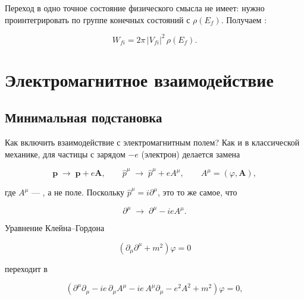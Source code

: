\documentclass[../final.tex]{subfiles}
\begin{document}
Переход в одно точное состояние физического смысла не имеет:
нужно проинтегрировать по группе конечных состояний с
 $\rho(E_f)$.
Получаем :

\begin{equation*}
    W_{fi}
    =
    2\pi\,|V_{fi}|^2\,\rho(E_f).
\end{equation*}


\section{Электромагнитное взаимодействие}

\subsection{Минимальная подстановка}

Как включить взаимодействие с электромагнитным полем?
Как и в классической механике, для частицы с зарядом $-e$
(электрон) делается замена

\begin{equation*}
    \mathbf p\;\longrightarrow\;\mathbf p+e\mathbf A,
    \qquad
    \hat p^\mu\;\longrightarrow\;\hat p^\mu+eA^\mu,
    \qquad
    A^\mu=(\varphi,\mathbf A),
\end{equation*}

где $A^\mu$ --- , а не поле.
Поскольку $\hat p^\mu=i\partial^\mu$, это то же самое, что

\begin{equation*}
    \partial^\mu
    \;\longrightarrow\;
    \partial^\mu-ieA^\mu.
\end{equation*}

Уравнение Клейна--Гордона

\begin{equation*}
    \left(\partial_\mu\partial^\mu+m^2\right)\varphi=0
\end{equation*}

переходит в 

\begin{equation*}
    \left(
        \partial^\mu\partial_\mu
        -ie\,\partial_\mu A^\mu
        -ie\,A^\mu\partial_\mu
        -e^2A^2
        +m^2
    \right)\varphi
    =
    0,
\end{equation*}
\end{document}
